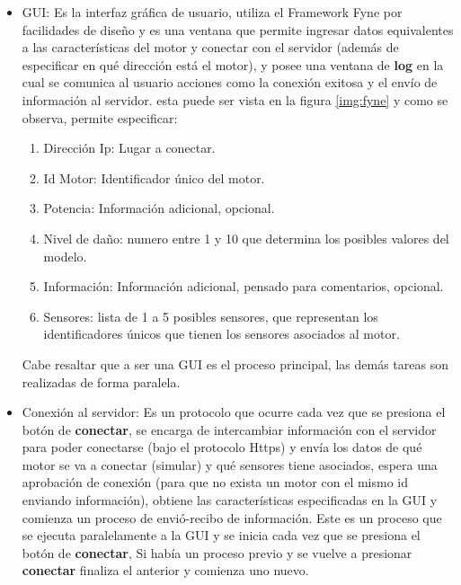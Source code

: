 \begin{itemize}
    \item GUI: Es la interfaz gráfica de usuario, utiliza el Framework Fyne por
        facilidades
        de diseño y es una ventana que permite ingresar datos equivalentes
        a las características del motor y conectar con el servidor (además de
        especificar en qué dirección está el motor), y posee una ventana de
        \textbf{log}  en la cual se comunica al usuario acciones como la conexión exitosa y
        el envío de información al servidor. esta puede ser vista
        en la figura \ref{img:fyne} y como se observa, permite especificar:
        \begin{enumerate}
            \item Dirección Ip: Lugar a conectar.
            \item Id Motor: Identificador único del motor.
            \item Potencia: Información adicional, opcional.
            \item Nivel de daño: numero entre 1 y 10 que determina los posibles
                valores del modelo.
            \item Información: Información adicional, pensado para comentarios,
                opcional.
            \item Sensores: lista de 1 a 5 posibles sensores, que representan
                los identificadores únicos que tienen los sensores asociados
                al motor.
        \end{enumerate}

        Cabe resaltar que a ser una GUI es el proceso principal, las demás
        tareas son realizadas de forma paralela.

    \item Conexión al servidor: Es un protocolo que ocurre cada vez que se presiona
        el botón de \textbf{conectar}, se encarga de intercambiar información con el servidor
        para poder conectarse (bajo el protocolo Https) y envía los datos de
        qué motor se va a conectar (simular) y qué sensores tiene asociados, espera
        una aprobación de conexión (para que no exista un motor con el mismo id enviando
        información), obtiene las características especificadas en la GUI y
        comienza un proceso de envió-recibo de información.
        Este es un proceso
        que se ejecuta paralelamente a la GUI y se inicia cada vez que se
        presiona el botón de \textbf{conectar}, Si había un proceso previo y se vuelve a
        presionar \textbf{conectar} finaliza el anterior y comienza uno nuevo.


\end{itemize}
